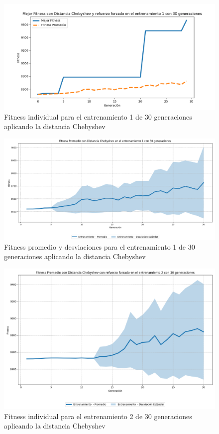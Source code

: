 \documentclass[conference]{IEEEtran}
\begin{document}
\begin{figure}[H]
    \centering
    \includegraphics[width=0.9 \linewidth]{Chebyshev/Fitness_individual_30Gen/Fitness_1_Cheby_30Gen.png}
    \caption{Fitness individual para el entrenamiento 1 de 30 generaciones aplicando la distancia Chebyshev}
    \label{fig:cheb_1_30}
\end{figure}
\begin{figure}[H]
    \centering
    \includegraphics[width=0.9 \linewidth]{Chebyshev/Fitness_individual_30Gen/Fitness_1_Cheby_30Gen_Sombra.png}
    \caption{Fitness promedio y desviaciones para el entrenamiento 1 de 30 generaciones aplicando la distancia Chebyshev}
    \label{fig:cheb_1_30_sombra}
\end{figure}

\begin{figure}[H]
    \centering
    \includegraphics[width=0.9 \linewidth]{Chebyshev/Fitness_individual_30Gen/Fitness_2_Cheby_30Gen_Sombra.png}
    \caption{Fitness individual para el entrenamiento 2 de 30 generaciones aplicando la distancia Chebyshev}
    \label{fig:cheb_2_30_sombra}
\end{figure}
\end{document}
